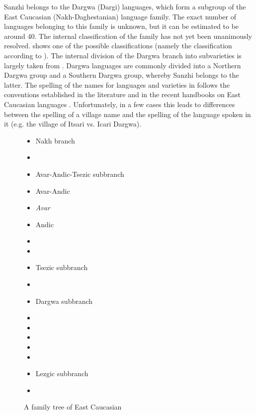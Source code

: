 Sanzhi belongs to the Dargwa (Dargi) languages, which form a subgroup of the East Caucasian (Nakh-Daghestanian) language family. The exact number of languages belonging to this family is unknown, but it can be estimated to be around 40. The internal classification of the family has not yet been unanimously resolved.  shows one of the possible classifications (namely the classification according to \citealt[xi]{Kibrik1996}). The internal division of the Dargwa branch into subvarieties is largely taken from \citet{Korjakov2006}. Dargwa languages are commonly divided into a Northern Dargwa group and a Southern Dargwa group, whereby Sanzhi belongs to the latter. The spelling of the names for languages and varieties in   follows the conventions established in the literature and in the recent handbooks on East Caucasian languages \citep{PolinskyInPress, KoryakovEtAllInPreparation}. Unfortunately, in a few cases this leads to differences between the spelling of a village name and the spelling of the language spoken in it (e.g. the village of Itsari vs. Icari Dargwa).
%
\begin{figure}
	\caption{A family tree of East Caucasian}
	\label{fig:classificationtree}

	\small
	\begin{itemize}
		\item[]	Nakh branch
		\item[]	\qquad{}

		\item[]	Avar-Andic-Tsezic subbranch
		\item[]	\qquad Avar-Andic
		\item[] \qquad\qquad \textit{Avar}
		\item[]	\qquad\qquad Andic
		\item[]	\qquad\qquad\qquad{} 
		\item[]	\qquad\qquad\qquad{}

		\item[]	\qquad Tsezic subbranch
		\item[]	\qquad\qquad{}

		\item[]	Dargwa subbranch
		\item[]	\qquad{}
		\item[]	\qquad{}
		\item[]	\qquad{}

		\item[]	
		\item[]	

		\item[]	Lezgic subbranch
		\item[]	\qquad{}
	\end{itemize}
\end{figure}


